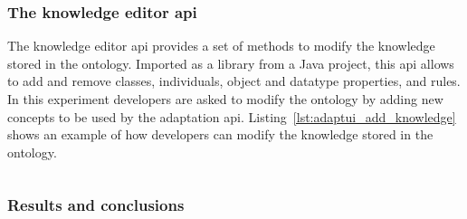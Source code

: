 \subsubsection{The knowledge editor \ac{api}}
\label{sec:knowledge_editor_api}

The knowledge editor \ac{api} provides a set of methods to modify the knowledge
stored in the ontology. Imported as a library from a Java project, this \ac{api}
allows to add and remove classes, individuals, object and datatype properties,
and rules. In this experiment developers are asked to modify the ontology by
adding new concepts to be used by the adaptation \ac{api}.
Listing~\ref{lst:adaptui_add_knowledge} shows an example of how developers can
modify the knowledge stored in the ontology.

\inputminted[linenos=true, fontsize=\footnotesize, frame=lines]{java}{5_experiments_and_results/adaptui_add_knowledge.java}

\subsubsection{Results and conclusions}
\label{sec:api_results}